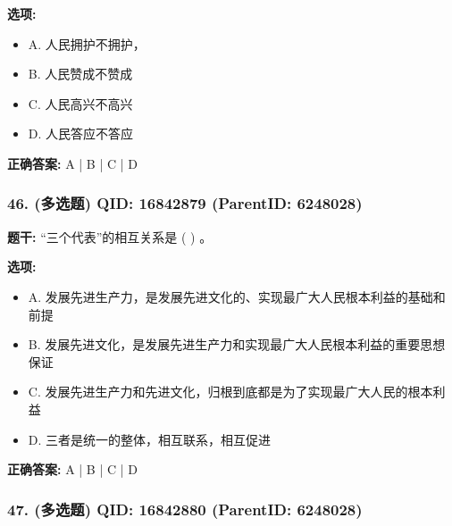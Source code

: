 \documentclass[12pt,UTF8]{ctexart}
\begin{document}
\textbf{选项:}
\begin{itemize}[leftmargin=*]

  \item A. 人民拥护不拥护，

  \item B. 人民赞成不赞成

  \item C. 人民高兴不高兴

  \item D. 人民答应不答应

\end{itemize}

\textbf{正确答案:}
A | B | C | D

\vspace{0.3em}\hrulefill\vspace{0.7em}

\subsubsection*{46. (多选题) \small QID: 16842879 (ParentID: 6248028)}

\textbf{题干:}
“三个代表”的相互关系是 ( ) 。



\textbf{选项:}
\begin{itemize}[leftmargin=*]

  \item A. 发展先进生产力，是发展先进文化的、实现最广大人民根本利益的基础和前提

  \item B. 发展先进文化，是发展先进生产力和实现最广大人民根本利益的重要思想保证

  \item C. 发展先进生产力和先进文化，归根到底都是为了实现最广大人民的根本利益

  \item D. 三者是统一的整体，相互联系，相互促进

\end{itemize}

\textbf{正确答案:}
A | B | C | D

\vspace{0.3em}\hrulefill\vspace{0.7em}

\subsubsection*{47. (多选题) \small QID: 16842880 (ParentID: 6248028)}
\end{document}
